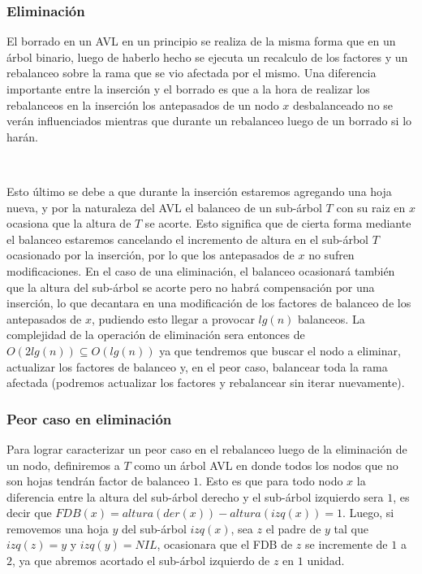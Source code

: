 \documentclass[10pt, a4paper]{report}
\begin{document}
\subsubsection{Eliminaci\'on}

El borrado en un AVL en un principio se realiza de la misma forma que en un \'arbol binario, luego de haberlo hecho se ejecuta un recalculo de los factores y un rebalanceo sobre la rama que se vio afectada por el mismo. Una diferencia importante entre la inserci\'on y el borrado es que a la hora de realizar los rebalanceos en la inserci\'on los antepasados de un nodo $x$ desbalanceado no se ver\'an influenciados mientras que durante un rebalanceo luego de un borrado si lo har\'an. 

~

Esto \'ultimo se debe a que durante la inserci\'on estaremos agregando una hoja nueva, y por la naturaleza del AVL el balanceo de un sub-\'arbol $T$ con su raiz en $x$ ocasiona que la altura de $T$ se acorte. Esto significa que de cierta forma mediante el balanceo estaremos cancelando el incremento de altura en el sub-\'arbol $T$ ocasionado por la inserci\'on, por lo que los antepasados de $x$ no sufren modificaciones. En el caso de una eliminaci\'on, el balanceo ocasionar\'a tambi\'en que la altura del sub-\'arbol se acorte pero no habr\'a compensaci\'on por una inserci\'on, lo que decantara en una modificaci\'on de los factores de balanceo de los antepasados de $x$, pudiendo esto llegar a provocar $lg(n)$ balanceos. La complejidad de la operaci\'on de eliminaci\'on sera entonces de $O(2lg(n)) \subseteq O(lg(n))$ ya que tendremos que buscar el nodo a eliminar, actualizar los factores de balanceo y, en el peor caso, balancear toda la rama afectada (podremos actualizar los factores y rebalancear sin iterar 
nuevamente).

\subsubsection{Peor caso en eliminaci\'on}

Para lograr caracterizar un peor caso en el rebalanceo luego de la eliminaci\'on de un nodo, definiremos a $T$ como un \'arbol AVL en donde todos los nodos que no son hojas tendr\'an factor de balanceo $1$. Esto es que para todo nodo $x$ la diferencia entre la altura del sub-\'arbol derecho y el sub-\'arbol izquierdo sera $1$, es decir que $FDB(x) = altura(der(x))-altura(izq(x)) = 1$. Luego, si removemos una hoja $y$ del sub-\'arbol $izq(x)$, sea $z$ el padre de $y$ tal que $izq(z)=y$ y $izq(y) = NIL$, ocasionara que el FDB de $z$ se incremente de $1$ a $2$, ya que abremos acortado el sub-\'arbol izquierdo de $z$ en $1$ unidad.
\end{document}
